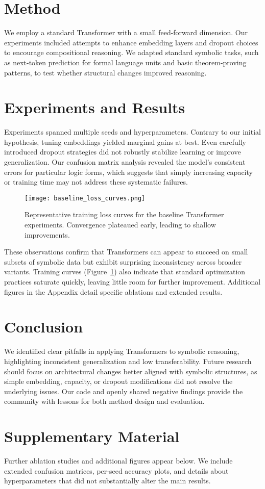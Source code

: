 \documentclass{article}
\begin{document}
\section{Method}
We employ a standard Transformer with a small feed-forward dimension. Our experiments included attempts to enhance embedding layers and dropout choices to encourage compositional reasoning. We adapted standard symbolic tasks, such as next-token prediction for formal language units and basic theorem-proving patterns, to test whether structural changes improved reasoning.

\section{Experiments and Results}
\label{sec:results}
Experiments spanned multiple seeds and hyperparameters. Contrary to our initial hypothesis, tuning embeddings yielded marginal gains at best. Even carefully introduced dropout strategies did not robustly stabilize learning or improve generalization. Our confusion matrix analysis revealed the model's consistent errors for particular logic forms, which suggests that simply increasing capacity or training time may not address these systematic failures.

\begin{figure}[t]
\centering
\texttt{[image: baseline\_loss\_curves.png]}
\caption{Representative training loss curves for the baseline Transformer experiments. Convergence plateaued early, leading to shallow improvements.}
\label{fig:baseline}
\end{figure}

These observations confirm that Transformers can appear to succeed on small subsets of symbolic data but exhibit surprising inconsistency across broader variants. Training curves (Figure~\ref{fig:baseline}) also indicate that standard optimization practices saturate quickly, leaving little room for further improvement. Additional figures in the Appendix detail specific ablations and extended results.

\section{Conclusion}
We identified clear pitfalls in applying Transformers to symbolic reasoning, highlighting inconsistent generalization and low transferability. Future research should focus on architectural changes better aligned with symbolic structures, as simple embedding, capacity, or dropout modifications did not resolve the underlying issues. Our code and openly shared negative findings provide the community with lessons for both method design and evaluation.




\appendix
\section{Supplementary Material}
Further ablation studies and additional figures appear below. We include extended confusion matrices, per-seed accuracy plots, and details about hyperparameters that did not substantially alter the main results.
\end{document}
